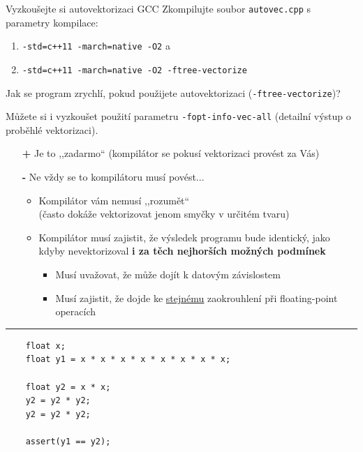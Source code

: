 \documentclass[usenames,dvipsnames,9pt]{beamer}
\begin{document}
\begin{frame}
  \begin{block}{Vyzkoušejte si autovektorizaci GCC}
    Zkompilujte soubor \texttt{autovec.cpp} s parametry kompilace:
    \begin{enumerate}
      \item \texttt{-std=c++11 -march=native -O2} \hspace{6pt} a
      \item \texttt{-std=c++11 -march=native -O2 -ftree-vectorize}
    \end{enumerate}
    Jak se program zrychlí, pokud použijete autovektorizaci (\texttt{-ftree-vectorize})?
  \end{block}
  Můžete si i vyzkoušet použití parametru \texttt{-fopt-info-vec-all} (detailní výstup o proběhlé vektorizaci).
\end{frame}

\begin{frame}[fragile]
  \begin{itemize}
    \item[\LARGE\bf\textcolor{OliveGreen}{+}] Je to ,,zadarmo`` (kompilátor se pokusí vektorizaci provést za Vás) \\[2em]
    \pause
    \item[\LARGE\bf\textcolor{BrickRed}{-}] Ne vždy se to kompilátoru musí povést...
    \pause
    \begin{itemize}
      \item Kompilátor vám nemusí ,,rozumět``\\
            (často dokáže vektorizovat jenom smyčky v určitém tvaru) \\[0.6em]
      \pause
      \item Kompilátor musí zajistit, že výsledek programu bude identický, jako kdyby nevektorizoval \textbf{i za těch nejhorších možných podmínek}
            \begin{itemize}
              \item Musí uvažovat, že může dojít k datovým závislostem
              \item Musí zajistit, že dojde ke \underline{stejnému} zaokrouhlení při floating-point operacích
            \end{itemize}
    \end{itemize}
  \end{itemize}

  \pause
  \vspace{1em}\hrule\vspace{1em}

  \begin{verbatim}
    float x;
    float y1 = x * x * x * x * x * x * x * x;

    float y2 = x * x;
    y2 = y2 * y2;
    y2 = y2 * y2;

    assert(y1 == y2);
  \end{verbatim}
\end{frame}
\end{document}
